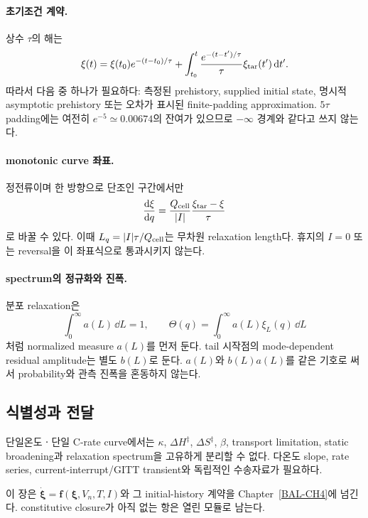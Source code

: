 \paragraph{ 초기조건 계약.}
상수 $\tau$의 해는
\begin{equation}
\xi(t)=\xi(t_0)e^{-(t-t_0)/\tau}
+\int_{t_0}^{t}\frac{e^{-(t-t')/\tau}}{\tau}
\xi_{\mathrm{tar}}(t')\,\mathrm d t'.
\label{KIN-011-EQUATION}
\end{equation}
따라서 다음 중 하나가 필요하다: 측정된 prehistory, supplied
initial state, 명시적 asymptotic prehistory 또는 오차가 표시된
finite-padding approximation. $5\tau$ padding에는 여전히
$e^{-5}\simeq0.00674$의 잔여가 있으므로 $-\infty$ 경계와 같다고
쓰지 않는다.

\paragraph{ monotonic curve 좌표.}
정전류이며 한 방향으로 단조인 구간에서만
\[
\frac{\mathrm d\xi}{\mathrm d q}
=\frac{Q_{\mathrm{cell}}}{|I|}
\frac{\xi_{\mathrm{tar}}-\xi}{\tau}
\]
로 바꿀 수 있다. 이때 $L_q=|I|\tau/Q_{\mathrm{cell}}$는 무차원
relaxation length다. 휴지의 $I=0$ 또는 reversal을 이 좌표식으로
통과시키지 않는다.

\paragraph{ spectrum의 정규화와 진폭.}
분포 relaxation은
\[
\int_0^\infty a(L)\,\dd L=1,\qquad
\Theta(q)=\int_0^\infty a(L)\xi_L(q)\,\dd L
\]
처럼 normalized measure $a(L)$를 먼저 둔다. tail 시작점의
mode-dependent residual amplitude는 별도 $b(L)$로 둔다.
$a(L)$와 $b(L)a(L)$를 같은 기호로 써서 probability와 관측
진폭을 혼동하지 않는다.

\subsection{식별성과 전달}\label{KIN-CH3-IDENT}

\begin{identifiability}
단일온도ㆍ단일 C-rate curve에서는 $\kappa$, $\Delta H^\ddagger$,
$\Delta S^\ddagger$, $\beta$, transport limitation, static
broadening과 relaxation spectrum을 고유하게 분리할 수 없다.
다온도 slope, rate series, current-interrupt/GITT transient와
독립적인 수송자료가 필요하다.
\end{identifiability}

이 장은 $\dot{\bm\xi}=\bm f(\bm\xi,V_n,T,I)$와 그 initial-history
계약을 Chapter~\ref{BAL-CH4}에 넘긴다. constitutive closure가
아직 없는 항은 열린 모듈로 남는다.
